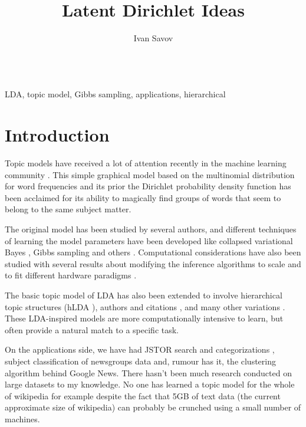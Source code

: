\documentclass[letterpaper,11pt]{article}
\author{Ivan Savov}
\title{ {\LARGE Latent Dirichlet Ideas } }
\begin{document}
\maketitle


\ \\
 LDA, topic model, Gibbs sampling, applications, hierarchical


\section{Introduction}

	Topic models have received a lot of attention recently in the machine learning 
	community \cite{Blei2003,Blei2009}.
	This simple graphical model based on the multinomial distribution for word frequencies 
	and its prior the Dirichlet probability density function has been acclaimed for
	its ability to magically find groups of words that seem to belong to the same subject matter.
	
	
	The original model has been studied by several authors, and different 
	techniques of learning the model parameters have been developed
	like collapsed variational Bayes \cite{teh2007collapsed}, Gibbs sampling \cite{porteous2008fast} and others \cite{Teh2009}.
	Computational considerations have also been studied with several results
	about modifying the inference algorithms to scale \cite{newman2006scalable,newman2007distributed} and to fit 
	different hardware paradigms \cite{masada2009accelerating, yan-parallel}.
	
	The basic topic model of LDA has also been extended to involve hierarchical 
	topic structures (hLDA \cite{blei2004hierarchical}), authors and citations \cite{rosen2004author},  
	and many other variations \cite{williamson2009focused,mimno2007expertise,boyd2007topic}.
	These LDA-inspired models are more computationally intensive to learn, 
	but often provide a natural match to a specific task.
	
	On the applications side, we have had JSTOR search and categorizations \cite{Blei2009},
	subject classification of newsgroups data and, rumour has it, the clustering algorithm  behind Google News. 
	There hasn't been much research conducted on large datasets to my knowledge. 
	No one has learned a topic model for the whole of wikipedia for example despite the
	fact that 5GB of text data (the current approximate size of wikipedia) can probably
	be crunched using a small number of machines.
	
\end{document}
